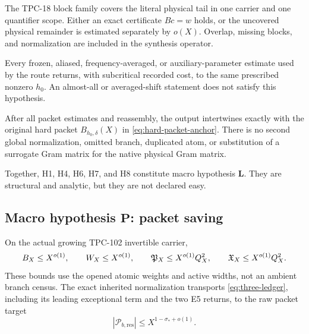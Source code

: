 \begin{hypothesis}
\label{hyp:full-block}
The TPC-18 block family covers the literal physical tail in one
carrier and one quantifier scope.  Either an exact certificate
\(Bc=w\) holds, or the uncovered physical remainder is estimated
separately by \(o(X)\).  Overlap, missing blocks, and normalization
are included in the synthesis operator.
\end{hypothesis}

\begin{hypothesis}
\label{hyp:localization}
Every frozen, aliased, frequency-averaged, or auxiliary-parameter
estimate used by the route returns, with subcritical recorded cost, to
the same prescribed nonzero \(h_0\).  An almost-all or averaged-shift
statement does not satisfy this hypothesis.
\end{hypothesis}

\begin{hypothesis}
\label{hyp:reconnection}
After all packet estimates and reassembly, the output intertwines
exactly with the original hard packet \(B_{h_0,\delta}(X)\) in
\eqref{eq:hard-packet-anchor}.  There is no second global
normalization, omitted branch, duplicated atom, or substitution of a
surrogate Gram matrix for the native physical Gram matrix.
\end{hypothesis}

Together, H1, H4, H6, H7, and H8 constitute macro hypothesis
\(\mathbf L\).  They are structural and analytic, but they are not
declared easy.

\subsection{Macro hypothesis
\texorpdfstring{\(\mathbf P\)}{P}: packet saving}

\begin{hypothesis}
\label{hyp:resonance}
On the actual growing TPC-102 invertible carrier,
\begin{equation}
B_X\le X^{o(1)},\qquad
W_X\le X^{o(1)},\qquad
\mathfrak P_X\le X^{o(1)}Q_X^2,\qquad
\mathfrak X_X\le X^{o(1)}Q_X^2.
\label{eq:resonance-hypothesis}
\end{equation}
These bounds use the opened atomic weights and active widths, not an
ambient branch census.  The exact inherited normalization transports
\eqref{eq:three-ledger}, including its leading exceptional term and
the two E5 returns, to the raw packet target
\[
|\mathcal P_{b,\mathrm{res}}|
\le X^{1-\sigma_*+o(1)}.
\]
\end{hypothesis}

